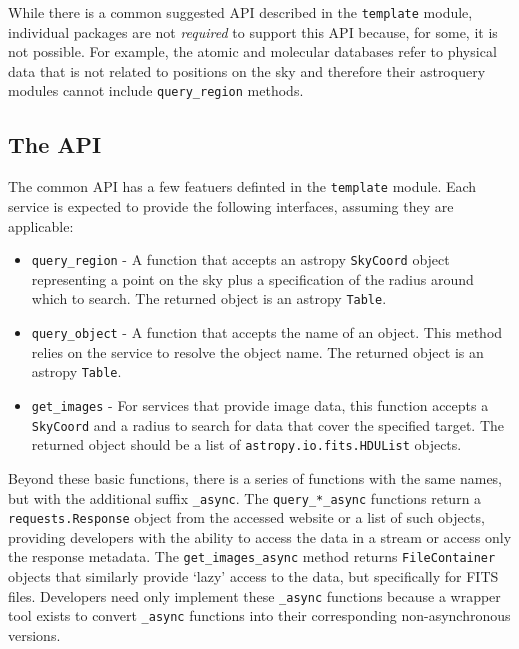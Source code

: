 \documentclass{article}
\begin{document}
While there is a common suggested API described in the \texttt{template} module,
individual packages are not \emph{required} to support this API because, for
some, it is not possible.  For example, the atomic and molecular databases refer
to physical data that is not related to positions on the sky and therefore
their astroquery modules cannot include \texttt{query\_region} methods.

\subsection{The API}
The common API has a few featuers definted in the \texttt{template} module.
Each service is expected to provide the following interfaces, assuming they are
applicable:

\begin{itemize}
    \item \texttt{query\_region} - A function that accepts an astropy
        \texttt{SkyCoord} object representing a point on the sky plus a
        specification of the radius around which to search.
        The returned object is an astropy \texttt{Table}.
    \item \texttt{query\_object} - A function that accepts the name of an
        object.  This method relies on the service to resolve the object name.
        The returned object is an astropy \texttt{Table}.
    \item \texttt{get\_images} - For services that provide image data, this
        function accepts a \texttt{SkyCoord} and a radius to search for data
        that cover the specified target. The returned object should be a list
        of \texttt{astropy.io.fits.HDUList} objects.
\end{itemize}

Beyond these basic functions, there is a series of functions with the same
names, but with the additional suffix \texttt{\_async}.  The
\texttt{query\_*\_async} functions return a \texttt{requests.Response} object
from the accessed website or a list of such objects, providing developers with
the ability to access the data in a stream or access only the response
metadata.  The \texttt{get\_images\_async} method returns
\texttt{FileContainer} objects that similarly provide `lazy' access to the
data, but specifically for FITS files.  Developers need only implement
these \texttt{\_async} functions because a wrapper tool exists to convert
\texttt{\_async} functions into their corresponding non-asynchronous versions.
\end{document}
